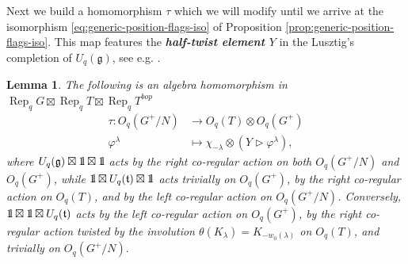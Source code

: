 \documentclass[a4paper]{article}
\numberwithin{equation}{section}
\newtheorem{lemma}[counter]{Lemma}
\newcommand{\idty}{{\mathrm{1}\mkern-4mu{\mathchoice{}{}{\mskip-0.5mu}{\mskip-1mu}}\mathrm{l}}}
\newcommand{\1}{{\mathrm{1}\mkern-4mu{\mathchoice{}{}{\mskip-0.5mu}{\mskip-1mu}}\mathrm{l}}}
\DeclareMathOperator{\Rep}{Rep}
\renewcommand{\t}{\mathfrak{t}}
\newcommand{\g}{\mathfrak{g}}
\begin{document}
Next we build a homomorphism $\tau$ which we will modify until we arrive at the isomorphism \eqref{eq:generic-position-flags-iso} of Proposition \ref{prop:generic-position-flags-iso}.
This map features the \emph{\bf half-twist element $Y$} in the Lusztig's completion of $U_q(\g)$, see e.g. \cite[\S 4.1]{Snyder_Tingley_2009}.
\begin{lemma}\label{lemma:GpN-to-TGp}
    The following is an algebra homomorphism in $\Rep_qG \boxtimes \Rep_qT \boxtimes \Rep_qT^{bop}$
    \begin{equation}
        \begin{aligned}
        \tau : O_q(G^+/N) &\to O_q(T)\otimes O_q(G^+)\\
        \varphi^\lambda &\mapsto \chi_{-\lambda} \otimes( Y\rhd \varphi^\lambda ),
    \end{aligned}
    \end{equation}
    where $U_q(\mathfrak{g})\boxtimes \idty \boxtimes \idty$ acts by the right co-regular action on both $O_q(G^+/N)$ and $O_q(G^+)$, while $\idty\boxtimes U_q(\t)\boxtimes \idty$ acts trivially on $O_q(G^+)$, by the right co-regular action on $O_q(T)$, and by the left co-regular action on $O_q(G^+/N)$.
    Conversely, $\idty\boxtimes \idty \boxtimes U_q(\t)$ acts by the left co-regular action on $O_q(G^+)$, by the right co-regular action twisted by the involution $\theta(K_\lambda) = K_{-w_0(\lambda)}$ on $O_q(T)$, and trivially on $O_q(G^+/N).$
\end{lemma}
\end{document}
